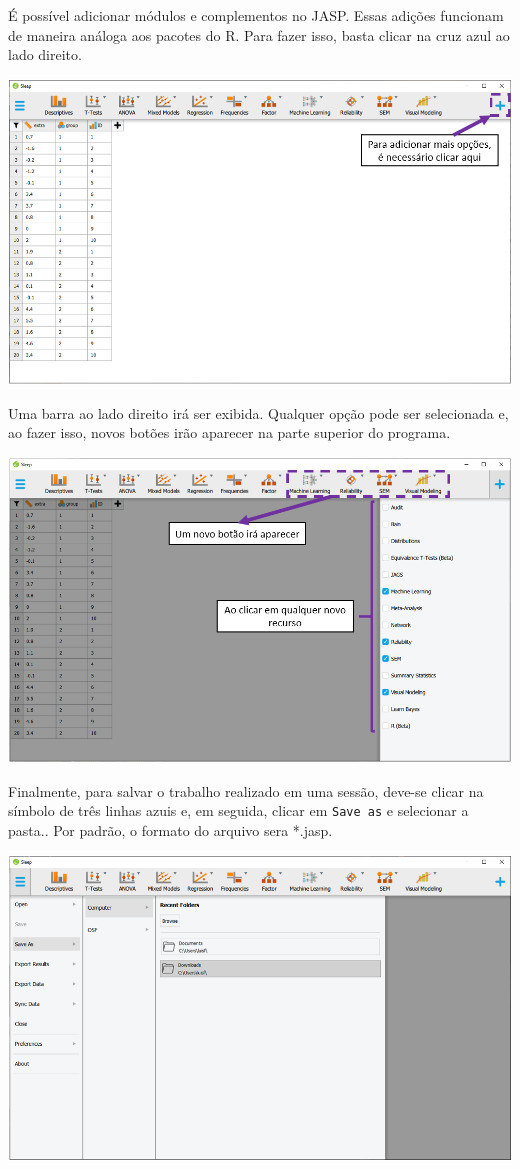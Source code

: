 \documentclass[
]{book}
\begin{document}
É possível adicionar módulos e complementos no JASP. Essas adições funcionam de maneira análoga aos pacotes do R. Para fazer isso, basta clicar na cruz azul ao lado direito.

\includegraphics{./img/cap_jasp_adicionar_modulos.png}

Uma barra ao lado direito irá ser exibida. Qualquer opção pode ser selecionada e, ao fazer isso, novos botões irão aparecer na parte superior do programa.

\includegraphics{./img/cap_jasp_adicionar_modulos2.png}

Finalmente, para salvar o trabalho realizado em uma sessão, deve-se clicar na símbolo de três linhas azuis e, em seguida, clicar em \texttt{Save\ as} e selecionar a pasta.. Por padrão, o formato do arquivo sera *.jasp.

\includegraphics{./img/cap_jasp_salvar.png}
\end{document}

